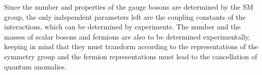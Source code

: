 Since the number and properties of the gauge bosons are determined by the SM group, %
the only independent parameters left are the coupling constants of the interactions, which can be determined by experiments.
The number and the masses of scalar bosons and fermions are also to be determined experimentally, %
keeping in mind that they must transform according to the representations of the symmetry group %
and the fermion representations must lead to the cancellation of quantum anomalies.

